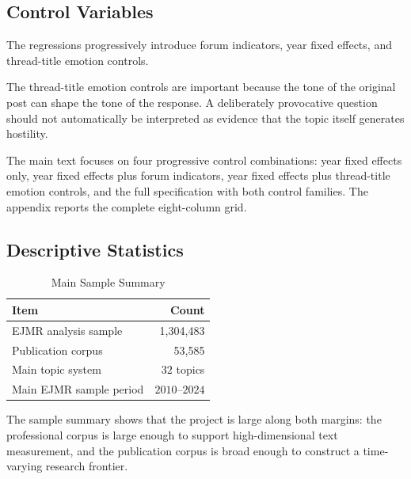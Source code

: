 \documentclass[11pt]{article}
\begin{document}
\subsection{Control Variables}

The regressions progressively introduce forum indicators, year fixed effects, and thread-title emotion controls.

The thread-title emotion controls are important because the tone of the original post can shape the tone of the response. A deliberately provocative question should not automatically be interpreted as evidence that the topic itself generates hostility.

The main text focuses on four progressive control combinations: year fixed effects only, year fixed effects plus forum indicators, year fixed effects plus thread-title emotion controls, and the full specification with both control families. The appendix reports the complete eight-column grid.

\subsection{Descriptive Statistics}

\begin{table}[H]
    \centering
    \caption{Main Sample Summary}
    \label{tab:sample_summary}
    \begin{tabular}{p{}r}
        \toprule
        Item & Count \\
        \midrule
        EJMR analysis sample & 1,304,483 \\
        Publication corpus & 53,585 \\
        Main topic system & $32$ topics \\
        Main EJMR sample period & $2010$--$2024$ \\
        \bottomrule
    \end{tabular}
\end{table}

The sample summary shows that the project is large along both margins: the professional corpus is large enough to support high-dimensional text measurement, and the publication corpus is broad enough to construct a time-varying research frontier.
\end{document}
